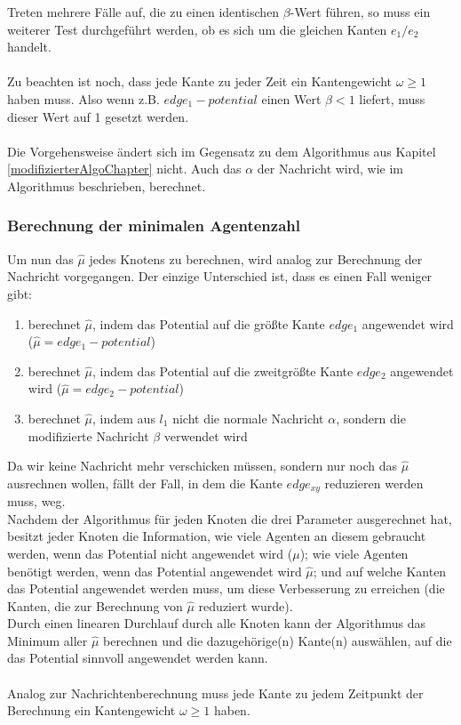 	Treten mehrere Fälle auf, die zu einen identischen $\beta$-Wert führen, so muss ein weiterer Test durchgeführt werden, ob es sich um die gleichen Kanten $e_{1} / e_{2}$ handelt. 
	\\
	\\
	Zu beachten ist noch, dass jede Kante zu jeder Zeit ein Kantengewicht $\omega \geq 1$ haben muss. Also wenn z.B. $edge_{1} - potential$ einen Wert $\beta < 1$ liefert, muss dieser Wert auf 1 gesetzt werden.
	\\
	\\
	Die Vorgehensweise ändert sich im Gegensatz zu dem Algorithmus aus Kapitel \ref{modifizierterAlgoChapter} nicht. Auch das $\alpha$ der Nachricht wird, wie im Algorithmus beschrieben, berechnet.
	
	
	\subsubsection{Berechnung der minimalen Agentenzahl}
	
	Um nun das $\hat{\mu}$ jedes Knotens zu berechnen, wird analog zur Berechnung der Nachricht vorgegangen. Der einzige Unterschied ist, dass es einen Fall weniger gibt: 
	\begin{enumerate}
		\item berechnet $\hat{\mu}$, indem das Potential auf die größte Kante $edge_{1}$ angewendet wird ($\hat{\mu} = edge_{1} - potential$) 
		\item berechnet $\hat{\mu}$, indem das Potential auf die zweitgrößte Kante $edge_{2}$ angewendet wird ($\hat{\mu} = edge_{2} - potential$)
		\item berechnet $\hat{\mu}$, indem aus $l_{1}$ nicht die normale Nachricht $\alpha$, sondern die modifizierte Nachricht $\beta$ verwendet wird
	\end{enumerate}
	Da wir keine Nachricht mehr verschicken müssen, sondern nur noch das $\hat{\mu}$ ausrechnen wollen, fällt der Fall, in dem die Kante $edge_{xy}$ reduzieren werden muss, weg.\\
	Nachdem der Algorithmus für jeden Knoten die drei Parameter ausgerechnet hat, besitzt jeder Knoten die Information, wie viele Agenten an diesem gebraucht werden, wenn das Potential nicht angewendet wird ($\mu$); wie viele Agenten benötigt werden, wenn das Potential angewendet wird $\hat{\mu}$; und auf welche Kanten das Potential angewendet werden muss, um diese Verbesserung zu erreichen (die Kanten, die zur Berechnung von $\hat{\mu}$ reduziert wurde).\\
	Durch einen linearen Durchlauf durch alle Knoten kann der Algorithmus das Minimum aller $\hat{\mu}$ berechnen und die dazugehörige(n) Kante(n) auswählen, auf die das Potential sinnvoll angewendet werden kann.
	\\
	\\
	Analog zur Nachrichtenberechnung muss jede Kante zu jedem Zeitpunkt der Berechnung ein Kantengewicht $\omega \geq 1$ haben. 
	
